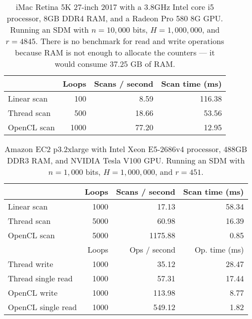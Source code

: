 \begin{table}[!htb]
\centering
\begin{tabular}{| l | r | r | r |}
    \hline
    & Loops & Scans / second & Scan time (ms) \\ \hline
    Linear scan & 100 & 8.59 & 116.38 \\
    Thread scan & 500 & 18.66 & 53.56 \\
    OpenCL scan & 1000 & 77.20 & 12.95 \\
    \hline
\end{tabular}
\caption{iMac Retina 5K 27-inch 2017 with a 3.8GHz Intel core i5 processor, 8GB DDR4 RAM, and a Radeon Pro 580 8G GPU. Running an SDM with $n=10,000$ bits, $H=1,000,000$, and $r=4845$.  There is no benchmark for read and write operations because RAM is not enough to allocate the counters --- it would consume 37.25 GB of RAM.
\label{tab:perf-imac-10k}}
\end{table}


\begin{table}[!htb]
\centering
\begin{tabular}{| l | r | r | r |}
    \hline
    & Loops & Scans / second & Scan time (ms) \\ \hline
    Linear scan & 1000 & 17.13 & 58.34 \\
    Thread scan & 5000 & 60.98 & 16.39 \\
    OpenCL scan & 5000 & 1175.88 & 0.85 \\ \hline
    \hline
    & Loops & Ops / second & Op. time (ms) \\ \hline
    Thread write & 1000 & 35.12 & 28.47 \\
    Thread single read & 1000 & 57.31 & 17.44 \\
    OpenCL write & 1000 & 113.98 & 8.77 \\
    OpenCL single read & 1000 & 549.12 & 1.82 \\
    \hline
\end{tabular}
\caption{Amazon EC2 p3.2xlarge with Intel Xeon E5-2686v4 processor, 488GB DDR3 RAM, and NVIDIA Tesla V100 GPU. Running an SDM with $n=1,000$ bits, $H=1,000,000$, and $r=451$.}
\end{table}

